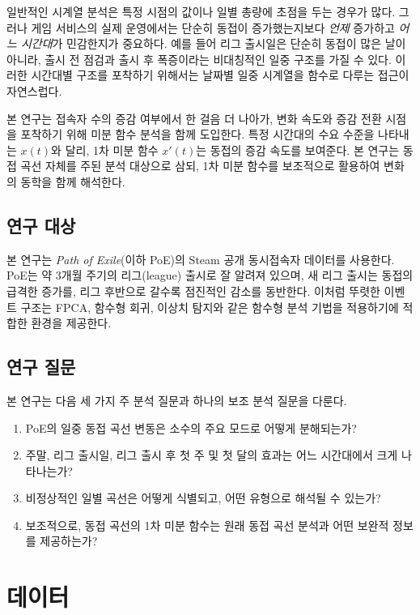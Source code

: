 \documentclass[11pt,a4paper]{article}
\begin{document}
일반적인 시계열 분석은 특정 시점의 값이나 일별 총량에 초점을 두는 경우가 많다. 그러나 게임 서비스의 실제 운영에서는 단순히 동접이 증가했는지보다 \emph{언제} 증가하고 \emph{어느 시간대}가 민감한지가 중요하다. 예를 들어 리그 출시일은 단순히 동접이 많은 날이 아니라, 출시 전 점검과 출시 후 폭증이라는 비대칭적인 일중 구조를 가질 수 있다. 이러한 시간대별 구조를 포착하기 위해서는 날짜별 일중 시계열을 함수로 다루는 접근이 자연스럽다.

본 연구는 접속자 수의 증감 여부에서 한 걸음 더 나아가, 변화 속도와 증감 전환 시점을 포착하기 위해 미분 함수 분석을 함께 도입한다. 특정 시간대의 수요 수준을 나타내는 $x(t)$와 달리, 1차 미분 함수 $x'(t)$는 동접의 증감 속도를 보여준다. 본 연구는 동접 곡선 자체를 주된 분석 대상으로 삼되, 1차 미분 함수를 보조적으로 활용하여 변화의 동학을 함께 해석한다.

\subsection{연구 대상}
본 연구는 \textit{Path of Exile}(이하 PoE)의 Steam 공개 동시접속자 데이터를 사용한다. PoE는 약 3개월 주기의 리그(league) 출시로 잘 알려져 있으며, 새 리그 출시는 동접의 급격한 증가를, 리그 후반으로 갈수록 점진적인 감소를 동반한다. 이처럼 뚜렷한 이벤트 구조는 FPCA, 함수형 회귀, 이상치 탐지와 같은 함수형 분석 기법을 적용하기에 적합한 환경을 제공한다.

\subsection{연구 질문}
본 연구는 다음 세 가지 주 분석 질문과 하나의 보조 분석 질문을 다룬다.
\begin{enumerate}[label=(\arabic*)]
    \item PoE의 일중 동접 곡선 변동은 소수의 주요 모드로 어떻게 분해되는가?
    \item 주말, 리그 출시일, 리그 출시 후 첫 주 및 첫 달의 효과는 어느 시간대에서 크게 나타나는가?
    \item 비정상적인 일별 곡선은 어떻게 식별되고, 어떤 유형으로 해석될 수 있는가?
    \item 보조적으로, 동접 곡선의 1차 미분 함수는 원래 동접 곡선 분석과 어떤 보완적 정보를 제공하는가?
\end{enumerate}

\section{데이터}
\end{document}
